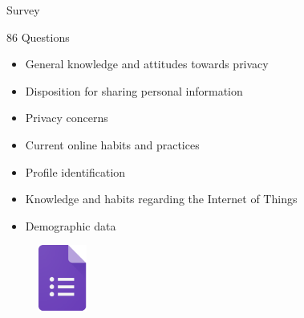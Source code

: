 \documentclass[xcolor={svgnames},compress,aspectratio=169]{beamer}
\begin{document}
\begin{frame}[shrink]{Survey}
    \begin{multicols}{2}
        86 Questions
        \begin{itemize}
            \item General knowledge and attitudes towards privacy
            \item Disposition for sharing personal information
            \item Privacy concerns
            \item Current online habits and practices
            \item Profile identification
            \item Knowledge and habits regarding the Internet of Things
            \item Demographic data
        \end{itemize}

        \columnbreak
        \vspace*{\fill}
        \begin{figure}
            \centering
            \includegraphics[width=45pt]{assets/images/forms.png}
        \end{figure}
        \vspace*{\fill}
    \end{multicols}
\end{frame}
\end{document}

